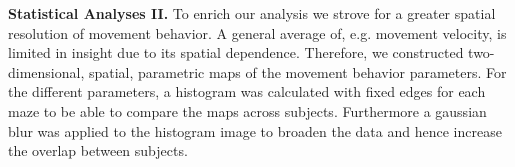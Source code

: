 
\indent \textbf{Statistical Analyses II.} To enrich our analysis we strove for a greater spatial resolution of movement behavior. A general average of, e.g. movement velocity, is limited in insight due to its spatial dependence. Therefore, we constructed two-dimensional, spatial, parametric maps of the movement behavior parameters. For the different parameters, a histogram was calculated with fixed edges for each maze to be able to compare the maps across subjects. Furthermore a gaussian blur was applied to the histogram image to broaden the data and hence increase the overlap between subjects.

